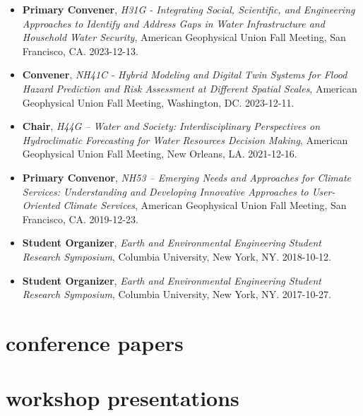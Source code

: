 \documentclass[10pt,oneside]{article}
\begin{document}
\begin{itemize}[label={}]
  
  \item \textbf{Primary Convener}, \textit{H31G - Integrating Social, Scientific, and Engineering Approaches to Identify and Address Gaps in Water Infrastructure and Household Water Security}, American Geophysical Union Fall Meeting, San Francisco, CA. 2023-12-13.
        
  \item \textbf{Convener}, \textit{NH41C - Hybrid Modeling and Digital Twin Systems for Flood Hazard Prediction and Risk Assessment at Different Spatial Scales}, American Geophysical Union Fall Meeting, Washington, DC. 2023-12-11.
        
  \item \textbf{Chair}, \textit{H44G -- Water and Society: Interdisciplinary Perspectives on Hydroclimatic Forecasting for Water Resources Decision Making}, American Geophysical Union Fall Meeting, New Orleans, LA. 2021-12-16.
        
  \item \textbf{Primary Convenor}, \textit{NH53 -- Emerging Needs and Approaches for Climate Services: Understanding and Developing Innovative Approaches to User-Oriented Climate Services}, American Geophysical Union Fall Meeting, San Francisco, CA. 2019-12-23.
        
  \item \textbf{Student Organizer}, \textit{Earth and Environmental Engineering Student Research Symposium}, Columbia University, New York, NY. 2018-10-12.
        
  \item \textbf{Student Organizer}, \textit{Earth and Environmental Engineering Student Research Symposium}, Columbia University, New York, NY. 2017-10-27.
        
\end{itemize}

\section{conference papers}

\mbox{}\vspace{-\dimexpr\baselineskip\relax}
\vspace*{-1em}
\printbibliography[type=inproceedings, heading=none]


\section{workshop presentations}
\end{document}
